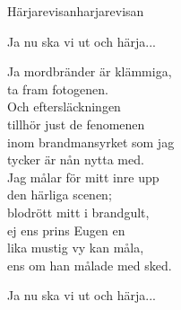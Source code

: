 \begin{song}{Härjarevisan}{harjarevisan}
\begin{vers}
Ja nu ska vi ut och härja... \\
\end{vers}
\begin{vers}
Ja mordbränder är klämmiga, \\
ta fram fotogenen.\\
Och eftersläckningen\\
tillhör just de fenomenen\\
inom brandmansyrket som jag\\
tycker är nån nytta med.\\
Jag målar för mitt inre upp\\
den härliga scenen;\\
blodrött mitt i brandgult,\\
ej ens prins Eugen en\\
lika mustig vy kan måla,\\
ens om han målade med sked.\\
\end{vers}
\begin{vers}
Ja nu ska vi ut och härja...\\
\end{vers}
\end{song}
